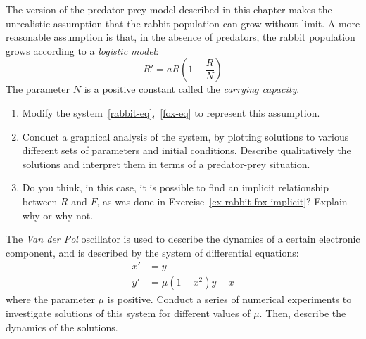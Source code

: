 \begin{exercise} The version of the predator-prey model described in this chapter makes the unrealistic assumption that the rabbit population can grow without limit. A more reasonable assumption is that, in the absence of predators, the rabbit population grows according to a \emph{logistic model}:
\[
R'=aR\left(1-\frac{R}{N}\right)
\]
The parameter $N$ is a positive constant called the \emph{carrying capacity}.
\begin{enumerate}
\item Modify the system~\eqref{rabbit-eq},~\eqref{fox-eq} to represent this assumption.
\item Conduct a graphical analysis of the system, by plotting solutions to various different sets of parameters and initial conditions. Describe qualitatively the solutions and interpret them in terms of a predator-prey situation.
\item Do you think, in this case, it is possible to find an implicit relationship between $R$ and $F$, as was done in Exercise~\ref{ex-rabbit-fox-implicit}? Explain why or why not.
\end{enumerate}
\end{exercise}

\begin{exercise} The \emph{Van der Pol} oscillator is used to describe the dynamics of a certain electronic component, and is described by the system of differential equations:
\begin{align*}
x' &= y\\
y' &= \mu(1-x^2)y-x
\end{align*}
where the parameter $\mu$ is positive. Conduct a series of numerical experiments to investigate solutions of this system for different values of $\mu$. Then, describe the dynamics of the solutions.  
\end{exercise}

